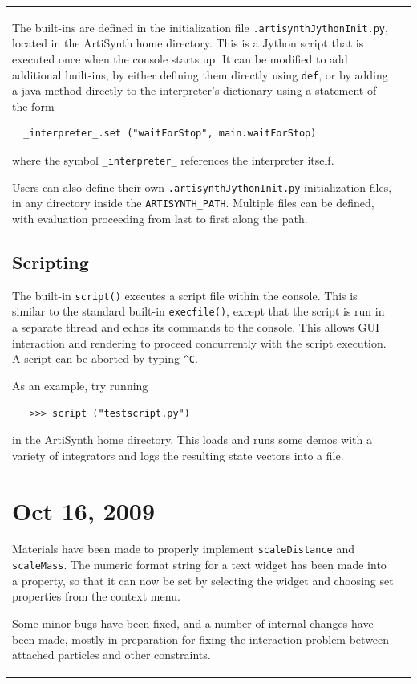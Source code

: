 \documentclass{article}
\begin{document}
\begin{tabular}{ll}
The built-ins are defined in the initialization file
{\tt .artisynthJythonInit.py}, located in the ArtiSynth home directory.
This is a Jython script that is executed once when the console starts
up. It can be modified to add additional built-ins, by either defining
them directly using {\tt def}, or by adding a java method directly to the
interpreter's dictionary using a statement of the form

\begin{verbatim}
  _interpreter_.set ("waitForStop", main.waitForStop)
\end{verbatim}

where the symbol {\tt \_interpreter\_} references the interpreter itself.

Users can also define their own {\tt .artisynthJythonInit.py}
initialization files, in any directory inside the
{\tt ARTISYNTH\_PATH}. Multiple files can be defined, with evaluation
proceeding from last to first along the path.

\subsection*{Scripting}

The built-in {\tt script()} executes a script file within the console. This
is similar to the standard built-in {\tt execfile()}, except that the script
is run in a separate thread and echos its commands to the
console. This allows
GUI interaction and rendering to proceed concurrently with the script
execution. A script can be aborted by typing {\tt \verb|^|C}.

As an example, try running 
\begin{verbatim}
   >>> script ("testscript.py")
\end{verbatim}
in the ArtiSynth home directory. This loads and runs some
demos with a variety of integrators and logs the resulting state
vectors into a file.

\section*{Oct 16, 2009}

Materials have been made to properly implement {\tt scaleDistance} and
{\tt scaleMass}. The numeric format string for a text widget has been made
into a property, so that it can now be set by selecting the widget and
choosing {\sf set properties} from the context menu.

Some minor bugs have been fixed, and a number of internal changes have
been made, mostly in preparation for fixing the interaction problem
between attached particles and other constraints.


\end{tabular}
\end{document}
